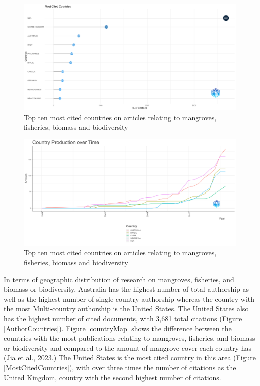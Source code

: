 \documentclass[
  12pt,
]{article}
\begin{document}
\begin{figure}
\includegraphics[width=1\linewidth]{MostCitedCountries} \caption{Top ten most cited countries on articles relating to mangroves, fisheries, biomass and biodiversity \label{MostCitedCountries}}\label{fig:MostCitedCountries}
\end{figure}

\begin{figure}
\includegraphics[width=1\linewidth]{CountryOverTime} \caption{Top ten most cited countries on articles relating to mangroves, fisheries, biomass and biodiversity \label{MostCitedCountries}}\label{fig:CountryOverTime}
\end{figure}



In terms of geographic distribution of research on mangroves, fisheries, and biomass or biodiversity, Australia has the highest number of total authorship as well as the highest number of single-country authorship whereas the country with the most Multi-country authorship is the United States. The United States also has the highest number of cited documents, with 3,681 total citations (Figure \ref{AuthorCountries}). Figure \ref{countryMap} shows the difference between the countries with the most publications relating to mangroves, fisheries, and biomass or biodiversity and compared to the amount of mangrove cover each country has (Jia et al., 2023.) The United States is the most cited country in this area (Figure \ref{MostCitedCountries}), with over three times the number of citations as the United Kingdom, country with the second highest number of citations.
\end{document}

